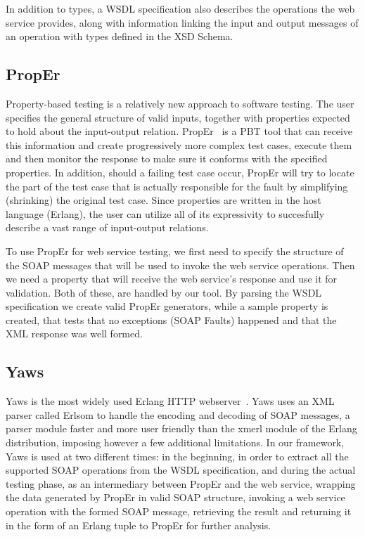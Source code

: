 \documentclass[submission,copyright,a4]{eptcs}
\begin{document}
In addition to types, a WSDL specification also describes the operations the 
web service provides, along with information linking the input and output 
messages of an operation with types defined in the XSD Schema. 

\subsection{PropEr}

Property-based testing is a relatively new approach to software
testing. The user specifies the general structure of valid inputs,
together with properties expected to hold about the input-output
relation. PropEr~\cite{proper_tool} is a PBT tool that can receive
this information and create progressively more complex test cases,
execute them and then monitor the response to make sure it conforms
with the specified properties. In addition, should a failing test case
occur, PropEr will try to locate the part of the test case that is
actually responsible for the fault by simplifying (shrinking) the
original test case. Since properties are written in the host language
(Erlang), the user can utilize all of its expressivity to succesfully
describe a vast range of input-output relations.

To use PropEr for web service testing, we first need to specify the structure
of the SOAP messages that will be used to invoke the web service operations. 
Then we need a property that will receive the web service's response and use 
it for validation. Both of these, are handled by our tool. By parsing the 
WSDL specification we create valid PropEr generators, while a sample property
is created, that tests that no exceptions (SOAP Faults) happened and that the 
XML response was well formed.


\subsection{Yaws}

Yaws is the most widely used Erlang HTTP webserver~\cite{yaws}. Yaws
uses an XML parser called Erlsom to handle the encoding and decoding
of SOAP messages, a parser module faster and more user friendly than
the xmerl module of the Erlang distribution, imposing however a few
additional limitations. In our framework, Yaws is used at two
different times: in the beginning, in order to extract all the
supported SOAP operations from the WSDL specification, and during the
actual testing phase, as an intermediary between PropEr and the web
service, wrapping the data generated by PropEr in valid SOAP
structure, invoking a web service operation with the formed SOAP
message, retrieving the result and returning it in the form of an
Erlang tuple to PropEr for further analysis.
\end{document}
